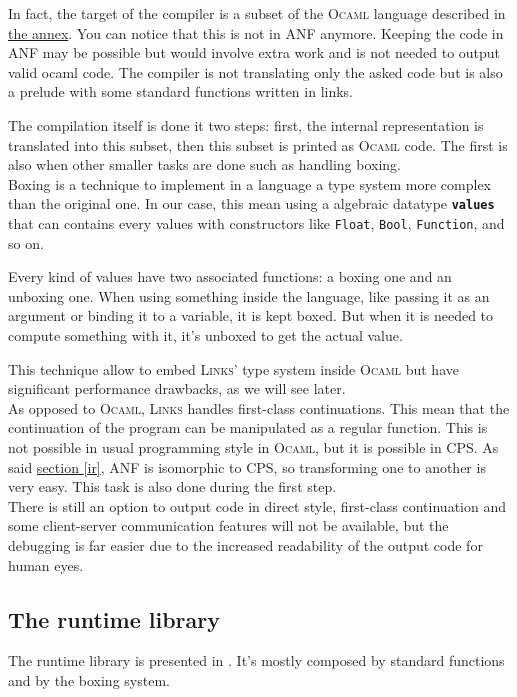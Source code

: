 \documentclass[11pt]{article}
\newcommand\mysc[1]{{\rmfamily\textsc{#1}}\xspace}
\newcommand\links{\mysc{Links}}
\newcommand\ocaml{\mysc{Ocaml}}
\newcommand\refsec[1]{\hyperref[#1]{section \ref*{#1}}}
\newcommand\sig[1]{{\tt\bf #1}}
\newcommand\ocamlc[1]{\lstinline[language={[Objective]Caml},basicstyle=\ttfamily\normalsize]{#1}}
\begin{document}
In fact, the target of the compiler is a subset of the \ocaml language described in \hyperref[ocamlsubset]{the annex}. You can notice that this is not in ANF anymore. Keeping the code in ANF may be possible but would involve extra work and is not needed to output valid ocaml code. The compiler is not translating only the asked code but is also a prelude with some standard functions written in links.

The compilation itself is done it two steps: first, the internal representation is translated into this subset, then this subset is printed as \ocaml code. The first is also when other smaller tasks are done such as handling boxing.\\

Boxing is a technique to implement in a language a type system more complex than the original one. In our case, this mean using a algebraic datatype \sig{values} that can contains every values with constructors like \ocamlc{Float}, \ocamlc{Bool}, \ocamlc{Function}, and so on.

Every kind of values have two associated functions: a boxing one and an unboxing one. When using something inside the language, like passing it as an argument or binding it to a variable, it is kept boxed. But when it is needed to compute something with it, it's unboxed to get the actual value.

This technique allow to embed \links' type system inside \ocaml but have significant performance drawbacks, as we will see later.\\

As opposed to \ocaml, \links handles first-class continuations. This mean that the continuation of the program can be manipulated as a regular function. This is not possible in usual programming style in \ocaml, but it is possible in CPS. 
As said \refsec{ir}, ANF is isomorphic to CPS, so transforming one to another is very easy. This task is also done during the first step.\\
There is still an option to output code in direct style, first-class continuation and some client-server communication features will not be available, but the debugging is far easier due to the increased readability of the output code for human eyes.

\subsection{The runtime library\label{runtime}}

The runtime library is presented in \cite{links:comp}. It's mostly composed by standard functions and by the boxing system. 
\end{document}
